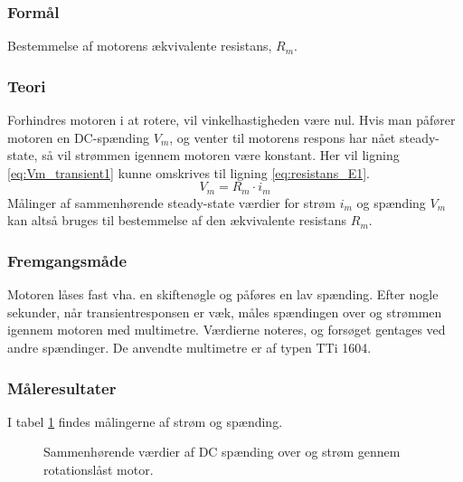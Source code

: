 \subsubsection{Formål}
Bestemmelse af motorens ækvivalente resistans, $R_m$.
\subsubsection{Teori}
Forhindres motoren i at rotere, vil vinkelhastigheden være nul.
Hvis man påfører motoren en DC-spænding $V_m$,
og venter til motorens respons har nået steady-state,
så vil strømmen igennem motoren være konstant.
Her vil ligning \ref{eq:Vm_transient1} kunne omskrives til ligning \ref{eq:resistans_E1}.
\begin{equation}
	V_m=R_m \cdot i_m
	\label{eq:resistans_E1} 
 \end{equation}
Målinger af sammenhørende steady-state værdier for strøm $i_m$ og spænding $V_m$
kan altså bruges til bestemmelse af den ækvivalente resistans $R_m$.
\subsubsection{Fremgangsmåde}
Motoren låses fast vha. en skiftenøgle og påføres en lav spænding.
Efter nogle sekunder, når transientresponsen er væk,
måles spændingen over og strømmen igennem motoren med multimetre.
Værdierne noteres, og forsøget gentages ved andre spændinger.
De anvendte multimetre er af typen TTi 1604.
\subsubsection{Måleresultater}
I tabel \ref{tb:resistans} findes målingerne af strøm og spænding.
\begin{figure}[th!]
	\centering
	
	\captionsetup{type=table}
	\caption[Sammenhørende værdier af DC spænding og strøm]
			{Sammenhørende værdier af DC spænding over og strøm gennem rotationslåst motor.}
	\label{tb:resistans}
\end{figure}
